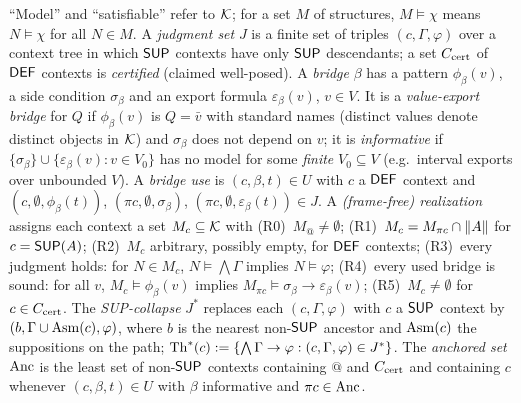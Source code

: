 \begin{definition}\label{def:physics:realization}
``Model'' and ``satisfiable'' refer to $\mathcal{K}$; for a set $M$ of structures, $M\models\chi$
means $N\models\chi$ for all $N\in M$. A \emph{judgment set} $J$ is a finite set of triples
$(c,\Gamma,\varphi)$ over a context tree in which $\mathsf{SUP}$ contexts have only $\mathsf{SUP}$
descendants; a set $C_{\mathrm{cert}}$ of $\mathsf{DEF}$ contexts is \emph{certified} (claimed well-posed). A
\emph{bridge} $\beta$ has a pattern $\phi_\beta(v)$, a side condition $\sigma_\beta$ and an
export formula $\varepsilon_\beta(v)$, $v\in V$. It is a \emph{value-export bridge} for $Q$
if $\phi_\beta(v)$ is $Q=\bar v$ with standard names (distinct values denote distinct
objects in $\mathcal{K}$) and $\sigma_\beta$ does not depend on $v$; it is \emph{informative} if
$\{\sigma_\beta\}\cup\{\varepsilon_\beta(v):v\in V_0\}$ has no model for some \emph{finite}
$V_0\subseteq V$ (e.g.\ interval exports over unbounded $V$). A \emph{bridge use} is
$(c,\beta,t)\in U$ with $c$ a $\mathsf{DEF}$ context and $(c,\emptyset,\phi_\beta(t))$,
$(\pi c,\emptyset,\sigma_\beta)$, $(\pi c,\emptyset,\varepsilon_\beta(t))\in J$. A
\emph{(frame-free) realization} assigns each context a set $M_c\subseteq\mathcal{K}$ with
(R0)~$M_@\neq\emptyset$; (R1)~$M_c=M_{\pi c}\cap\lVert A\rVert$ for $c=\mathsf{SUP}(A)$; (R2)~$M_c$
arbitrary, possibly empty, for $\mathsf{DEF}$ contexts; (R3)~every judgment holds: for
$N\in M_c$, $N\models\bigwedge\Gamma$ implies $N\models\varphi$; (R4)~every used bridge is
sound: for all $v$, $M_c\models\phi_\beta(v)$ implies $M_{\pi c}\models\sigma_\beta\to\varepsilon_\beta(v)$;
(R5)~$M_c\neq\emptyset$ for $c\in C_{\mathrm{cert}}$. The \emph{SUP-collapse} $J^*$ replaces each
$(c,\Gamma,\varphi)$ with $c$ a $\mathsf{SUP}$ context by $(b,\Gamma\cup\mathrm{Asm}(c),\varphi)$, where
$b$ is the nearest non-$\mathsf{SUP}$ ancestor and $\mathrm{Asm}(c)$ the suppositions on the path;
$\mathrm{Th}^*(c):=\{\bigwedge\Gamma\to\varphi:(c,\Gamma,\varphi)\in J^*\}$. The \emph{anchored set}
$\mathrm{Anc}$ is the least set of non-$\mathsf{SUP}$ contexts containing $@$ and $C_{\mathrm{cert}}$ and containing $c$
whenever $(c,\beta,t)\in U$ with $\beta$ informative and $\pi c\in\mathrm{Anc}$.
\end{definition}

